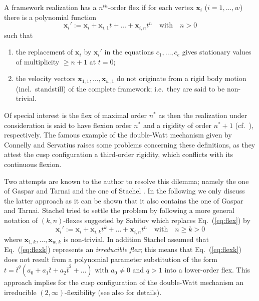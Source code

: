 \documentclass{svproc}
\def\Vkt#1{{\mathbf #1}}
\begin{document}
\begin{definition} \label{def1}
A framework realization has a $n^{th}$-order flex if for each vertex $\Vkt x_i$ ($i=1,\ldots,w$) 
there is a polynomial function 
\begin{equation}\label{eq:flex}
\Vkt x_i':=\Vkt x_i+ \Vkt x_{i,1}t+\ldots + \Vkt x_{i,n}t^n \quad \text{with} \quad n>0
\end{equation}
such that
\begin{enumerate}
\item
the replacement of $\Vkt x_i$ by $\Vkt x_i'$ in the equations $c_1,\ldots ,c_e$ gives stationary values 
of multiplicity $\geq n+1$ at $t=0$;
\item
the velocity vectors $\Vkt x_{1,1},\ldots ,\Vkt x_{w,1}$ do not originate from a rigid body motion (incl.\ standstill) 
of the complete framework; i.e.\ they are said to be non-trivial. 
\end{enumerate}
\end{definition}

Of special interest is the flex of maximal order $n^*$ as then the realization under consideration is said to have flexion order $n^*$ and a rigidity of order $n^*+1$ (cf.\ \cite{servatius}), respectively. The famous example of the double-Watt mechanism given by Connelly and Servatius \cite{servatius} raises some problems concerning these definitions, as they attest the cusp configuration a third-order rigidity, which conflicts with its continuous flexion. 

Two attempts are known to the author to resolve this dilemma; namely the one of Gaspar and Tarnai \cite{gaspar} and the one of Stachel \cite{stachel_proposal}. In the following we only discuss the latter approach as 
it can be shown \cite[Rmk.\ 3]{MMT} that it also 
contains the one of Gaspar and Tarnai.
Stachel \cite{stachel_proposal}  tried to settle the problem by following a more general notation of $(k,n)$-flexes suggested by Sabitov \cite{sabitov} which replaces Eq.\ (\ref{eq:flex}) 
by
\begin{equation}\label{eq:flexk}
\Vkt x_i':=\Vkt x_i+ \Vkt x_{i,k}t^k+\ldots + \Vkt x_{i,n}t^n \quad \text{with} \quad n\geq k>0
\end{equation}
where $\Vkt x_{1,k},\ldots ,\Vkt x_{w,k}$ is non-trivial. In addition Stachel assumed that Eq.\ (\ref{eq:flexk}) represents 
an {\it irreducible flex}; this means that  Eq.\ (\ref{eq:flexk}) does not result from 
a polynomial parameter substitution of the form
    $t=\overline{t}^q(a_0+a_1\overline{t}+a_2\overline{t}^2+\ldots)$ 
with $a_0\neq 0$ and $q>1$ into a lower-order flex.
This approach implies for the cusp configuration of the double-Watt mechanism an irreducible $(2,\infty)$-flexibility (see also \cite[ Ex.\ 2]{MMT} for details). 
\end{document}

